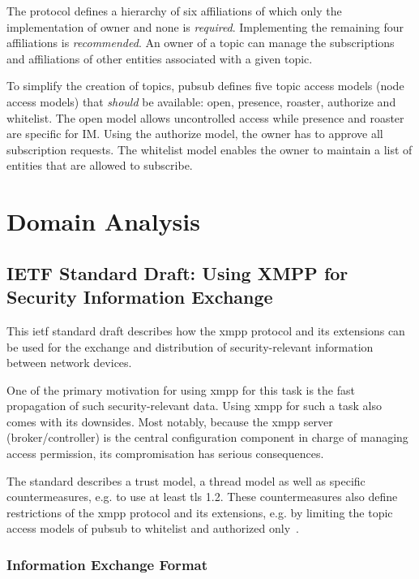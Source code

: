 The protocol defines a hierarchy of six affiliations of which only the implementation of owner and none is \emph{required}.
Implementing the remaining four affiliations is \emph{recommended}.
An owner of a \gls{topic} can manage the subscriptions and affiliations of other entities associated with a given \gls{topic}.

To simplify the creation of \glspl{topic}, \gls{pubsub} defines five \gls{topic} access models (node access models) that \emph{should} be available: open, presence, roaster, authorize and whitelist.
The open model allows uncontrolled access while presence and roaster are specific for IM. Using the authorize model, the owner has to approve all subscription requests.
The whitelist model enables the owner to maintain a list of entities that are allowed to subscribe.


\section{Domain Analysis}

\subsection{IETF Standard Draft: Using XMPP for Security Information Exchange}\label{sec:ietf-standard-draft-using-xmpp-for-security-information-exchange}
This \gls{ietf} standard draft describes how the \gls{xmpp} protocol and its extensions can be used for the exchange and distribution of security-relevant information between network devices.

One of the primary motivation for using \gls{xmpp} for this task is the fast propagation of such security-relevant data.
Using \gls{xmpp} for such a task also comes with its downsides. Most notably, because the \gls{xmpp} server (\gls{broker}/\gls{controller}) is the central configuration component in charge of managing access permission, its compromisation has serious consequences.

The standard describes a trust model, a thread model as well as specific countermeasures, e.g. to use at least \gls{tls} 1.2. These countermeasures also define restrictions of the \gls{xmpp} protocol and its extensions, e.g. by limiting the \gls{topic} access models of \gls{pubsub} to whitelist and authorized only~\cite{ietf-mile-xmpp-grid-05}.

\subsubsection{Information Exchange Format}

